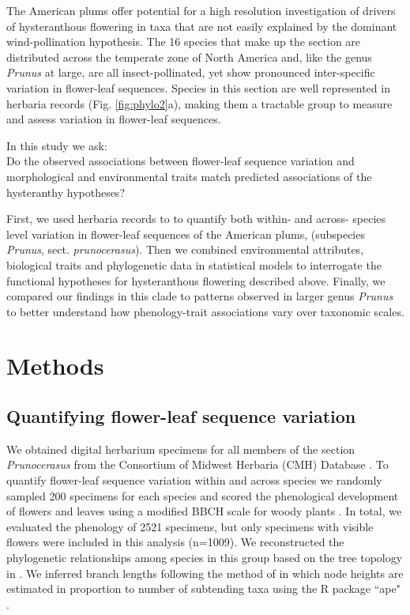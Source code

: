 \documentclass{article}[11pt]
\begin{document}
The American plums offer potential for a high resolution investigation of drivers of hysteranthous flowering in taxa that are not easily explained by the dominant wind-pollination hypothesis. The 16 species that make up the section are distributed across the temperate zone of North America and, like the genus \textit{Prunus} at large, are all insect-pollinated, yet show pronounced inter-specific variation in flower-leaf sequences. Species in this section are well represented in herbaria records (Fig. \ref{fig:phylo2}a), making them a tractable group to measure and assess variation in flower-leaf sequences.

\noindent In this study we ask:\\

Do the observed associations between flower-leaf sequence variation and morphological and environmental traits match predicted associations of the hysteranthy hypotheses? 

\noindent First, we used herbaria records to to quantify both within- and across- species level variation in flower-leaf sequences of the American plums, (subspecies  \textit{Prunus}, sect. \textit{prunocerasus}).
Then we combined environmental attributes, biological traits and phylogenetic data in statistical models to interrogate the functional hypotheses for hysteranthous flowering described above. Finally, we compared our findings in this clade to patterns observed in larger genus \emph{Prunus} to better understand how phenology-trait associations vary over taxonomic scales.


\section*{Methods}
\subsection{Quantifying flower-leaf sequence variation}  

We obtained digital herbarium specimens for all members of the section \textit{Prunocerasus} from the Consortium of Midwest Herbaria (CMH) Database \citep{add citation}. To quantify flower-leaf sequence variation within and across species we randomly sampled 200 specimens for each species and scored the phenological development of flowers and leaves using a modified BBCH scale for woody plants \citep{Finn2007}. In total, we evaluated the phenology of 2521 specimens, but only specimens with visible flowers were included in this analysis (n=1009). We reconstructed the phylogenetic relationships among species in this group based on the tree topology in \citet{Shaw:2004aa}. We inferred branch lengths following the method of \citet{Granfen1989}in which node heights are estimated in proportion to number of subtending taxa using the R package ``ape" \citep{Paradis2019}.
\end{document}
